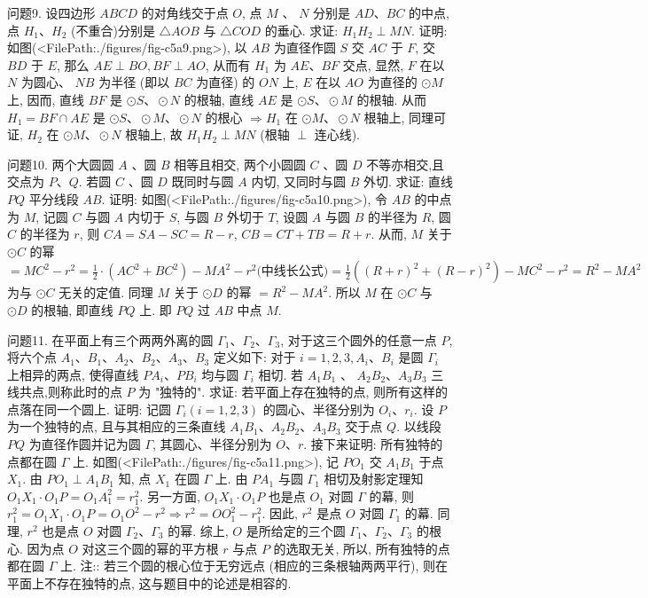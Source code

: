 问题9. 设四边形 $A B C D$ 的对角线交于点 $O$, 点 $M$ 、 $N$ 分别是 $A D 、 B C$ 的中点, 点 $H_1 、 H_2$ (不重合)分别是 $\triangle A O B$ 与 $\triangle C O D$ 的垂心.
求证: $H_1 H_2 \perp M N$.
证明: 如图(<FilePath:./figures/fig-c5a9.png>), 以 $A B$ 为直径作圆 $S$ 交 $A C$ 于 $F$, 交 $B D$ 于 $E$, 那么 $A E \perp B O, B F \perp A O$, 从而有 $H_1$ 为 $A E 、 B F$ 交点, 显然, $F$ 在以 $N$ 为圆心、 $N B$ 为半径 (即以 $B C$ 为直径) 的 $O N$ 上, $E$ 在以 $A O$ 为直径的 $\odot M$ 上, 因而, 直线 $B F$ 是 $\odot S 、 \odot N$ 的根轴, 直线 $A E$ 是 $\odot S 、 \odot M$ 的根轴.
从而 $H_1=B F \cap A E$ 是 $\odot S 、 \odot M 、 \odot N$ 的根心 $\Rightarrow H_1$ 在 $\odot M 、 \odot N$ 根轴上, 同理可证, $H_2$ 在 $\odot M 、 \odot N$ 根轴上, 故 $H_1 H_2 \perp M N$ (根轴 $\perp$ 连心线).



问题10. 两个大圆圆 $A$ 、圆 $B$ 相等且相交, 两个小圆圆 $C$ 、圆 $D$ 不等亦相交,且交点为 $P 、 Q$. 若圆 $C$ 、圆 $D$ 既同时与圆 $A$ 内切, 又同时与圆 $B$ 外切.
求证: 直线 $P Q$ 平分线段 $A B$.
证明: 如图(<FilePath:./figures/fig-c5a10.png>), 令 $A B$ 的中点为 $M$, 记圆 $C$ 与圆 $A$ 内切于 $S$, 与圆 $B$ 外切于 $T$, 设圆 $A$ 与圆 $B$ 的半径为 $R$, 圆 $C$ 的半径为 $r$, 则 $C A=S A-S C=R-r$, $C B=C T+T B=R+r$. 从而, $M$ 关于 $\odot C$ 的幂 $= M C^2-r^2=\frac{1}{2} \cdot\left(A C^2+B C^2\right)-M A^2-r^2 \text{(中线长公式)}=\frac{1}{2}\left((R+r)^2+(R-r)^2\right)-M C^2-r^2=R^2-M A^2$ 为与 $\odot C$ 无关的定值.
同理 $M$ 关于 $\odot D$ 的幂 $=R^2-M A^2$. 所以 $M$ 在 $\odot C$ 与 $\odot D$ 的根轴, 即直线 $P Q$ 上.
即 $P Q$ 过 $A B$ 中点 $M$.



问题11. 在平面上有三个两两外离的圆 $\Gamma_1 、 \Gamma_2 、 \Gamma_3$, 对于这三个圆外的任意一点 $P$, 将六个点 $A_1 、 B_1 、 A_2 、 B_2 、 A_3 、 B_3$ 定义如下: 对于 $i=1,2,3, A_i 、 B_i$ 是圆 $\Gamma_i$ 上相异的两点, 使得直线 $P A_i 、 P B_i$ 均与圆 $\Gamma_i$ 相切.
若 $A_1 B_1$ 、 $A_2 B_2 、 A_3 B_3$ 三线共点,则称此时的点 $P$ 为 "独特的". 求证: 若平面上存在独特的点, 则所有这样的点落在同一个圆上.
证明: 记圆 $\Gamma_i(i=1,2,3)$ 的圆心、半径分别为 $O_i 、 r_i$. 设 $P$ 为一个独特的点, 且与其相应的三条直线 $A_1 B_1 、 A_2 B_2 、 A_3 B_3$ 交于点 $Q$. 以线段 $P Q$ 为直径作圆并记为圆 $\Gamma$, 其圆心、半径分别为 $O 、 r$.
接下来证明: 所有独特的点都在圆 $\Gamma$ 上.
如图(<FilePath:./figures/fig-c5a11.png>), 记 $P O_1$ 交 $A_1 B_1$ 于点 $X_1$. 由 $P O_1 \perp A_1 B_1$ 知, 点 $X_1$ 在圆 $\Gamma$ 上.
由 $P A_1$ 与圆 $\Gamma_1$ 相切及射影定理知 $O_1 X_1 \cdot O_1 P= O_1 A_1^2=r_1^2$. 另一方面, $O_1 X_1 \cdot O_1 P$ 也是点 $O_1$ 对圆 $\Gamma$ 的幕, 则 $r_1^2=O_1 X_1 \cdot O_1 P=O_1 O^2-r^2 \Rightarrow r^2=O O_1^2-r_1^2$. 因此, $r^2$ 是点 $O$ 对圆 $\Gamma_1$ 的幕.
同理, $r^2$ 也是点 $O$ 对圆 $\Gamma_2 、 \Gamma_3$ 的幂.
综上, $O$ 是所给定的三个圆 $\Gamma_1 、 \Gamma_2 、 \Gamma_3$ 的根心.
因为点 $O$ 对这三个圆的幂的平方根 $r$ 与点 $P$ 的选取无关, 所以, 所有独特的点都在圆 $\Gamma$ 上.
注:: 若三个圆的根心位于无穷远点 (相应的三条根轴两两平行), 则在平面上不存在独特的点, 这与题目中的论述是相容的.



